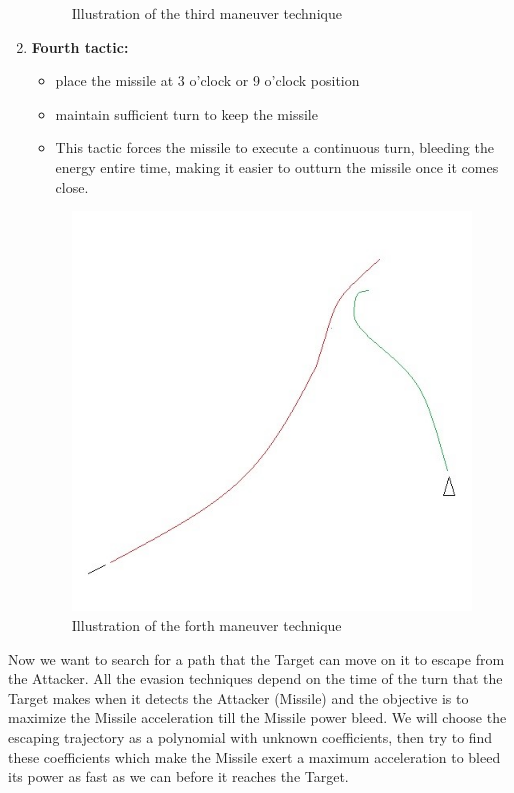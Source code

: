 \begin{enumerate}
\begin{figure}[H]
				\caption{Illustration of the third maneuver technique}
			\end{figure}
	\item \textbf{Fourth tactic:}
	\begin{itemize}
		\item place the missile at 3 o’clock or 9 o’clock position
		\item maintain sufficient turn to keep the missile 
		\item This tactic forces the missile to execute a continuous turn, bleeding the energy entire time, making it easier to outturn the missile once it comes close.
	\end{itemize}
			\begin{figure}[H]
			\centering
			\includegraphics[scale = 0.7]{fig/evasiontech4.jpg}
			\caption{Illustration of the forth maneuver technique}
			\end{figure}
\end{enumerate}


Now we want to search for a path that the Target can move on it to escape from the Attacker. All the evasion techniques depend on the time of the turn that the Target makes when it detects the Attacker (Missile) and the objective is to maximize the Missile acceleration till the Missile power bleed. 
We will  choose the escaping trajectory as a polynomial with unknown coefficients, then try to find these coefficients which make the Missile exert a maximum acceleration to bleed its power as fast as we can before it reaches the Target.  
